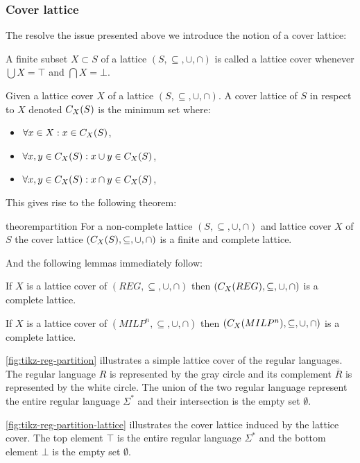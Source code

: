 \subsubsection{Cover lattice}

The resolve the issue presented above we introduce the notion of a cover lattice:

\begin{definition}
    A finite subset $X \subset S$ of a lattice $(S, \subseteq, \cup, \cap)$ is called a lattice cover whenever $\bigcup X = \top$ and $\bigcap X = \bot$.
\end{definition}

\begin{definition}
    Given a lattice cover $X$ of a lattice $(S, \subseteq, \cup, \cap)$.
    A cover lattice of $S$ in respect to $X$ denoted $C_{X}(S)$ is the minimum set where:
    \begin{itemize}
        \item $\forall x \in X: x \in C_{X}(S)$,
        \item $\forall x, y \in C_{X}(S) : x \cup y \in C_{X}(S)$,
        \item $\forall x, y \in C_{X}(S) : x \cap y \in C_{X}(S)$,
    \end{itemize}
\end{definition}

This gives rise to the following theorem:

\begin{restatable}{theorem}{partition}\label{thm:partition}
    For a non-complete lattice $(S, \subseteq, \cup, \cap)$ and lattice cover $X$ of $S$ the cover lattice $(C_{X}(S), \subseteq, \cup, \cap)$ is a finite and complete lattice.
\end{restatable}

And the following lemmas immediately follow:

\begin{lemma}
    If $X$ is a lattice cover of $(REG, \subseteq, \cup, \cap)$ then $(C_{X}(REG), \subseteq, \cup, \cap)$ is a complete lattice.
\end{lemma}

\begin{lemma}
    If $X$ is a lattice cover of $(MILP^n, \subseteq, \cup, \cap)$ then $(C_{X}(MILP^n), \subseteq, \cup, \cap)$ is a complete lattice.
\end{lemma}

\begin{example}
    \autoref{fig:tikz-reg-partition} illustrates a simple lattice cover of the regular languages. The regular language $R$ is represented by the gray circle and its complement $\overline{R}$ is represented by the white circle. The union of the two regular language represent the entire regular language $\Sigma^*$ and their intersection is the empty set $\emptyset$.

    \autoref{fig:tikz-reg-partition-lattice} illustrates the cover lattice induced by the lattice cover. The top element $\top$ is the entire regular language $\Sigma^*$ and the bottom element $\bot$ is the empty set $\emptyset$.
\end{example}

